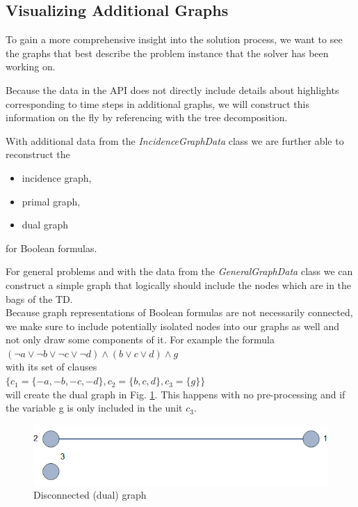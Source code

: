 \documentclass[a4paper, 12pt, bibliography=totoc]{scrartcl}
\begin{document}
\subsection{Visualizing Additional Graphs}
To gain a more comprehensive insight into the solution process, we want to see the graphs that best describe the problem instance that the solver has been working on.

Because the data in the API does not directly include details about highlights corresponding to time steps in additional graphs, we will construct this information on the fly by referencing with the tree decomposition.

With additional data from the \textit{IncidenceGraphData} class we are further able to reconstruct the
\begin{itemize}
	\item incidence graph,
	\item primal graph,
	\item dual graph
\end{itemize}
for Boolean formulas.

For general problems and with the data from the \textit{GeneralGraphData} class we can construct a simple graph that logically should include the nodes which are in the bags of the TD.\\


Because graph representations of Boolean formulas are not necessarily connected, we make sure to include potentially isolated nodes into our graphs as well and not only draw some components of it.
For example the formula \\
$(\neg a\lor \neg b\lor \neg c\lor \neg d)\land (b\lor c\lor d)\land g$\\

with its set of clauses \\
$\{c_{1}=\{-a,-b,-c,-d\},c_{2}=\{b,c,d\},c_{3}=\{g\}\}$ \\
will create the dual graph in Fig. \ref{fig:disconnected123}. This happens with no pre-processing and if the variable g is only included in the unit $c_{3}$.

\begin{figure}[H]
	\centering
	\includegraphics{images/disconnected123.png}
	\caption{Disconnected (dual) graph}
	\label{fig:disconnected123}
\end{figure}
\end{document}
